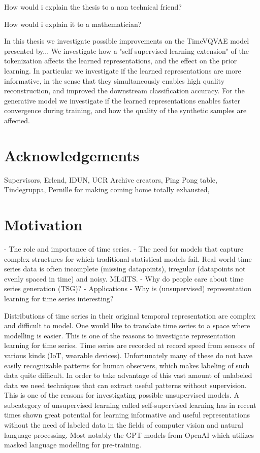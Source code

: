 \documentclass[../../thesis.tex]{subfiles}
\begin{document}
How would i explain the thesis to a non technical friend?

How would i explain it to a mathematician?

In this thesis we investigate possible improvements on the TimeVQVAE model presented by... We investigate how a "self supervised learning extension" of the tokenization affects the learned representations, and the effect on the prior learning. In particular we investigate if the learned representations are more informative, in the sense that they simultaneously enables high quality reconstruction, and improved the downstream classification accuracy. For the generative model we investigate if the learned representations enables faster convergence during training, and how the quality of the synthetic samples are affected. \\

\section{Acknowledgements}
Supervisors, Erlend, IDUN, UCR Archive creators, Ping Pong table, Tindegruppa, Pernille for making coming home totally exhausted, 

\section{Motivation}
	- The role and importance of time series.
	- The need for models that capture complex structures for which traditional statistical models fail. 
Real world time series data is often incomplete (missing datapoints), irregular (datapoints not evenly spaced in time) and noisy. ML4ITS. 
	- Why do people care about time series generation (TSG)?
		- Applications
	- Why is (unsupervised) representation learning for time series interesting?

Distributions of time series in their original temporal representation are complex and difficult to model. One would like to translate time series to a space where modelling is easier. This is one of the reasons to investigate representation learning for time series. Time series are recorded at record speed from sensors of various kinds (IoT, wearable devices). Unfortunately many of these do not have easily recognizable patterns for human observers, which makes labeling of such data quite difficult. In order to take advantage of this vast amount of unlabeled data we need techniques that can extract useful patterns without supervision. This is one of the reasons for investigating possible unsupervised models. A subcategory of unsupervised learning called self-supervised learning has in recent times shown great potential for learning informative and useful representations without the need of labeled data in the fields of computer vision and natural language processing. Most notably the GPT models from OpenAI which utilizes masked language modelling for pre-training. 
\end{document}

